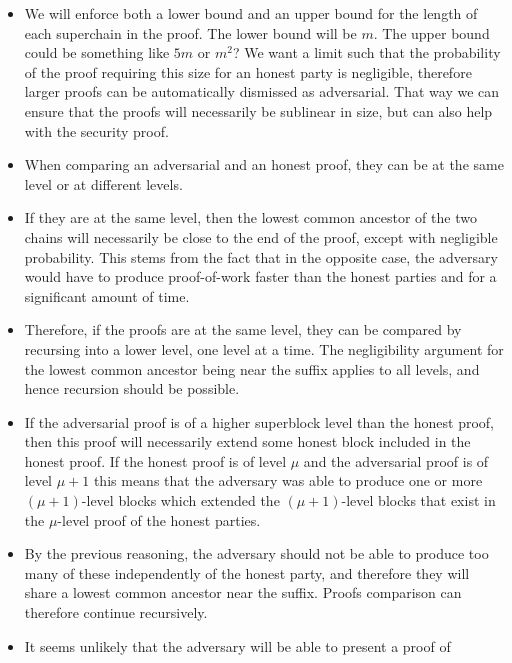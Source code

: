 \begin{itemize}
    \item
        We will enforce both a lower bound and an upper bound for the length of
        each superchain in the proof. The lower bound will be $m$. The upper
        bound could be something like $5m$ or $m^2$? We want a limit such that
        the probability of the proof requiring this size for an honest party is
        negligible, therefore larger proofs can be automatically dismissed as
        adversarial. That way we can ensure that the proofs will necessarily be
        sublinear in size, but can also help with the security proof.
    \item
        When comparing an adversarial and an honest proof, they can be at the
        same level or at different levels.
    \item
        If they are at the same level, then the lowest common ancestor of the
        two chains will necessarily be close to the end of the proof, except
        with negligible probability. This stems from the fact that in the
        opposite case, the adversary would have to produce proof-of-work faster
        than the honest parties and for a significant amount of time.
    \item
        Therefore, if the proofs are at the same level, they can be compared by
        recursing into a lower level, one level at a time. The negligibility
        argument for the lowest common ancestor being near the suffix applies
        to all levels, and hence recursion should be possible.
    \item
        If the adversarial proof is of a higher superblock level than the
        honest proof, then this proof will necessarily extend some honest block
        included in the honest proof. If the honest proof is of level $\mu$ and
        the adversarial proof is of level $\mu + 1$ this means that the
        adversary was able to produce one or more $(\mu + 1)$-level blocks
        which extended the $(\mu + 1)$-level blocks that exist in the
        $\mu$-level proof of the honest parties.
    \item
        By the previous reasoning, the adversary should not be able to produce
        too many of these independently of the honest party, and therefore they
        will share a lowest common ancestor near the suffix. Proofs comparison
        can therefore continue recursively.
    \item
        It seems unlikely that the adversary will be able to present a proof of

\end{itemize}
